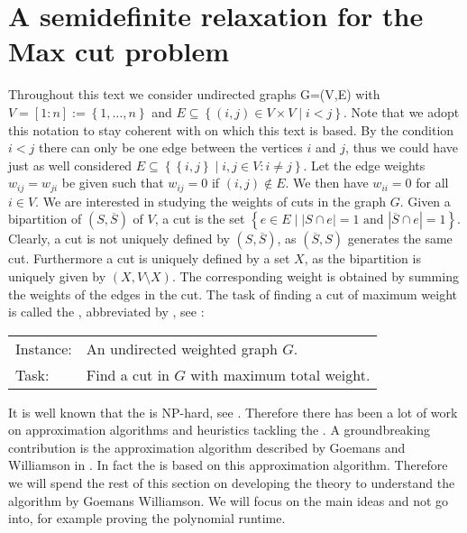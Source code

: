 \documentclass[12pt,a4paper]{article}
\theoremstyle{mythm}
\begin{document}
\section{A semidefinite relaxation for the Max cut problem} 
\label{sec:GoemansWilliamson} 
Throughout this text we consider undirected graphs G=(V,E) with $ V = \left[ 1:n \right] := \left\{ 1, \dots , n \right\} $ and $ E \subseteq \left\{ \left( i,j \right)  \in V \times V \mid i<j \right\} $.
Note that we adopt this notation to stay coherent with \cite{Burer2002} on which this text is based.
By the condition $ i < j $ there can only be one edge between the vertices $ i $ and $ j $, thus we could have just as well considered $ E \subseteq \left\{ \left\{ i,j
\right\}  \mid i,j \in V: i \neq j  \right\} $.
Let the edge weights $ w _{ ij } = w _{ ji }  $ be given such that $ w _{ ij } = 0 $ if $ \left( i,j \right) \notin E $. We then have $ w _{ ii } = 0 $ for all $ i \in V $.
We are interested in studying the weights of cuts in the graph $ G $.
Given a bipartition of $ \left( S , \overline{ S }  \right)  $ of $ V $, a cut is the set $ \left\{ e \in E \mid \left| S \cap e \right| = 1 \text{ and } \left| \overline{ S }
\cap e \right| = 1  \right\}  $. Clearly, a cut is not uniquely defined by $ \left( S , \overline{ S }  \right)  $, as $ \left( \overline{ S } , S \right)  $ generates the
same cut. 
Furthermore a cut is uniquely defined by a set $ X $, as the bipartition is uniquely given by $ \left( X, V \setminus X \right)  $.
The corresponding weight is obtained by summing the weights of the edges in the cut.
The task of finding a cut of maximum weight is called the \mcp , abbreviated by \MCP, see \cite{Korte2018}:
\begin{mdframed}[frametitle= {Maximum Weight Cut Problem}]
\begin{tabular}{ll}
Instance: &An undirected weighted graph $ G $. \\
Task: &Find a cut in $ G $ with maximum total weight.
\end{tabular}
\end{mdframed}
It is well known that the \MCP is NP-hard, see \cite{Garey1974}. Therefore there has been a lot of work on approximation algorithms and heuristics tackling the \MCP.
A groundbreaking contribution is the approximation algorithm described by Goemans and Williamson in \cite{GoemansWilliamson1995}.
In fact the \BH is based on this approximation algorithm.
Therefore we will spend the rest of this section on developing the theory to understand the algorithm by Goemans Williamson.
We will focus on the main ideas and not go into, for example proving the polynomial runtime. \\
\end{document}
